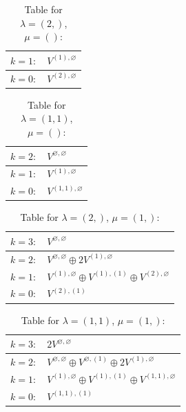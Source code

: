 \documentclass[a4paper,12pt]{article}
\begin{document}
\renewcommand{\arraystretch}{1.6} 
\begin{table}[H]
\centering
\caption{Table for $\lambda = (2,)$, $\mu = ()$:}
\begin{tabular}{|>{\centering\arraybackslash}p{15cm}|}
\hline
 $k = 1: \quad V^{(1), \varnothing} $ \\ \hline
 $k = 0: \quad V^{(2), \varnothing} $ \\ \hline
\end{tabular}
\end{table}

\renewcommand{\arraystretch}{1.6} 
\begin{table}[H]
\centering
\caption{Table for $\lambda = (1, 1)$, $\mu = ()$:}
\begin{tabular}{|>{\centering\arraybackslash}p{15cm}|}
\hline
 $k = 2: \quad V^{\varnothing, \varnothing} $ \\ \hline
 $k = 1: \quad V^{(1), \varnothing} $ \\ \hline
 $k = 0: \quad V^{(1, 1), \varnothing} $ \\ \hline
\end{tabular}
\end{table}

\renewcommand{\arraystretch}{1.6} 
\begin{table}[H]
\centering
\caption{Table for $\lambda = (2,)$, $\mu = (1,)$:}
\begin{tabular}{|>{\centering\arraybackslash}p{15cm}|}
\hline
 $k = 3: \quad V^{\varnothing, \varnothing} $ \\ \hline
 $k = 2: \quad V^{\varnothing, \varnothing} \oplus 2 V^{(1), \varnothing} $ \\ \hline
 $k = 1: \quad V^{(1), \varnothing} \oplus V^{(1), (1)} \oplus V^{(2), \varnothing} $ \\ \hline
 $k = 0: \quad V^{(2), (1)} $ \\ \hline
\end{tabular}
\end{table}

\renewcommand{\arraystretch}{1.6} 
\begin{table}[H]
\centering
\caption{Table for $\lambda = (1, 1)$, $\mu = (1,)$:}
\begin{tabular}{|>{\centering\arraybackslash}p{15cm}|}
\hline
 $k = 3: \quad 2 V^{\varnothing, \varnothing} $ \\ \hline
 $k = 2: \quad V^{\varnothing, \varnothing} \oplus V^{\varnothing, (1)} \oplus 2 V^{(1), \varnothing} $ \\ \hline
 $k = 1: \quad V^{(1), \varnothing} \oplus V^{(1), (1)} \oplus V^{(1, 1), \varnothing} $ \\ \hline
 $k = 0: \quad V^{(1, 1), (1)} $ \\ \hline
\end{tabular}
\end{table}
\end{document}
